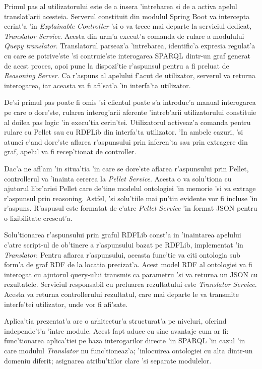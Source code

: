 \documentclass[12pt,a4paper,twoside]{report}
\begin{document}
Primul pas al utilizatorului este de a insera 'intrebarea si de a activa apelul translat'arii acesteia. Serverul constituit din modulul Spring Boot va intercepta cerint'a 'in {\it Explainable Controller} 'si o va trece mai departe la serviciul dedicat, {\it Translator Service}. Acesta din urm'a execut'a comanda de rulare a modulului {\it Quepy translator}. Translatorul parseaz'a 'intrebarea, identific'a expresia regulat'a cu care se potrive'ste 'si contruie'ste interogarea SPARQL dintr-un graf generat de acest proces, apoi pune la dispozi'tie r'aspunsul pentru a fi preluat de {\it Reasoning Server}. Ca r'aspuns al apelului f'acut de utilizator, serverul va returna interogarea, iar aceasta va fi afi'sat'a 'in interfa'ta utilizator.

De'si primul pas poate fi omis 'si clientul poate s'a introduc'a manual interogarea pe care o dore'ste, rularea interog'arii aferente 'intreb'arii utilizatorului constituie al doilea pas logic 'in execu'tia cerin'tei. Utilizatorul activeaz'a comanda pentru rulare cu Pellet sau cu RDFLib din interfa'ta utilizator. 'In ambele cazuri, 'si atunci c'and dore'ste aflarea r'aspunsului prin inferen'ta sau prin extragere din graf, apelul va fi recep'tionat de controller. 

Dac'a ne afl'am 'in situa'tia 'in care se dore'ste aflarea r'aspunsului prin Pellet, controllerul  va 'inainta cererea la {\it Pellet Service}. Acesta o va solu'tiona cu ajutorul libr'ariei Pellet care de'tine modelul ontologiei 'in memorie 'si va extrage r'aspunsul prin reasoning. Astfel, 'si solu'tiile mai pu'tin evidente vor fi incluse 'in r'aspuns. R'aspusul este formatat de c'atre {\it Pellet Service} 'in format JSON pentru o lizibilitate crescut'a.

Solu'tionarea r'aspunsului prin graful RDFLib const'a in 'inaintarea apelului c'atre script-ul de ob'tinere a r'aspunsului bazat pe RDFLib, implementat 'in {\it Translator}. Pentru aflarea r'aspunsului, aceasta func'tie va citi ontologia sub form'a de graf RDF de la locatia precizat'a. Acest model RDF al ontologiei va fi interogat cu ajutorul query-ului transmis ca parametru 'si va returna un JSON cu rezultatele. Serviciul responsabil cu preluarea rezultatului este {\it Translator Service}. Acesta va returna controllerului rezultatul, care mai departe le va transmite interfe'tei utilizator, unde vor fi afi'sate.

Aplica'tia prezentat'a are o arhitectur'a structurat'a pe niveluri, oferind independe't'a 'intre module. Acest fapt aduce cu sine avantaje cum ar fi: func'tionarea aplica'tiei pe baza interogarilor directe 'in SPARQL 'in cazul 'in care modulul {\it Translator} nu func'tioneaz'a; 'inlocuirea ontologiei cu alta dintr-un domeniu diferit; asignarea atribu'tiilor clare 'si separate modulelor. 
\end{document}

